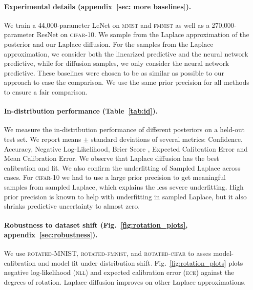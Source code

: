 \paragraph{Experimental details (appendix~\ref{sec: more baselines}).}
We train a  44,000-parameter LeNet\citep{lecun1989backpropagation} on \textsc{mnist} and \textsc{fmnist} as well as a 270,000-parameter ResNet\citep{he2016deep} on \textsc{cifar-10}\citep{krizhevsky2009learning}. We sample from the Laplace approximation of the posterior and our Laplace diffusion. For the samples from the Laplace approximation, we consider both the linearized predictive and the neural network predictive, while for diffusion samples, we only consider the neural network predictive. These baselines were chosen to be as similar as possible to our approach to ease the comparison. We use the same prior precision for all methods to ensure a fair comparison. 

\paragraph{In-distribution performance (Table~\ref{tab:id}).}
We measure the in-distribution performance of different posteriors on a held-out test set.  We report means $\pm$ standard deviations of several metrics: Confidence, Accuracy, Negative Log-Likelihood, Brier Score \citep{VERIFICATIONOFFORECASTSEXPRESSEDINTERMSOFPROBABILITY}, Expected Calibration Error \citep{naeini2015obtaining} and Mean Calibration Error. We observe that Laplace diffusion has the best calibration and fit. We also confirm the underfitting of Sampled Laplace across cases. For \textsc{cifar-10} we had to use a large prior precision to get meaningful samples from sampled Laplace, which explains the less severe underfitting. High prior precision is known to help with underfitting in sampled Laplace, but it also shrinks predictive uncertainty to almost zero. 
\paragraph{Robustness to dataset shift (Fig.~\ref{fig:rotation_plots}, appendix~\ref{sec:robustness}).}
We use \textsc{rotated-MNIST}, \textsc{rotated-fmnist}, and \textsc{rotated-cifar} to asses model-calibration and model fit under distribution shift. Fig.~\ref{fig:rotation_plots} plots negative log-likelihood (\textsc{nll}) and expected calibration error (\textsc{ece}) against the degrees of rotation. Laplace diffusion improves on other Laplace approximations.

